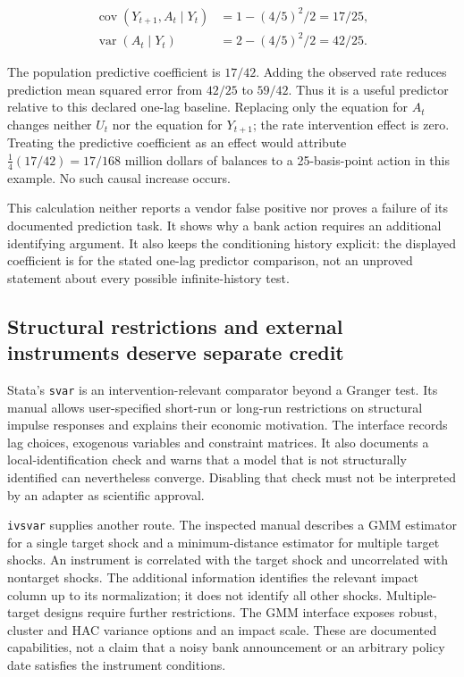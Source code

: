 \[
 \begin{aligned}
 \operatorname{cov}(Y_{t+1},A_t\mid Y_t)&=1-(4/5)^2/2=17/25,\\
 \operatorname{var}(A_t\mid Y_t)&=2-(4/5)^2/2=42/25.
 \end{aligned}
\]

The population predictive coefficient is \(17/42\). Adding the observed
rate reduces prediction mean squared error from \(42/25\) to \(59/42\).
Thus it is a useful predictor relative to this declared one-lag
baseline. Replacing only the equation for \(A_t\) changes neither
\(U_t\) nor the equation for \(Y_{t+1}\); the rate intervention effect
is zero. Treating the predictive coefficient as an effect would
attribute \(\tfrac14(17/42)=17/168\) million dollars of balances to a
25-basis-point action in this example. No such causal increase occurs.
\citep{exec13_ct_examples}

This calculation neither reports a vendor false positive nor proves a
failure of its documented prediction task. It shows why a bank action
requires an additional identifying argument. It also keeps the
conditioning history explicit: the displayed coefficient is for the
stated one-lag predictor comparison, not an unproved statement about
every possible infinite-history test.

\hypertarget{structural-restrictions-and-external-instruments-deserve-separate-credit}{%
\subsection{Structural restrictions and external instruments deserve
separate
credit}\label{structural-restrictions-and-external-instruments-deserve-separate-credit}}

Stata's \texttt{svar} is an intervention-relevant comparator beyond a
Granger test. Its manual allows user-specified short-run or long-run
restrictions on structural impulse responses and explains their economic
motivation. The interface records lag choices, exogenous variables and
constraint matrices. It also documents a local-identification check and
warns that a model that is not structurally identified can nevertheless
converge. Disabling that check must not be interpreted by an adapter as
scientific approval. \citep{exec13_ct_stata_svar}

\texttt{ivsvar} supplies another route. The inspected manual describes a
GMM estimator for a single target shock and a minimum-distance estimator
for multiple target shocks. An instrument is correlated with the target
shock and uncorrelated with nontarget shocks. The additional information
identifies the relevant impact column up to its normalization; it does
not identify all other shocks. Multiple-target designs require further
restrictions. The GMM interface exposes robust, cluster and HAC variance
options and an impact scale. These are documented capabilities, not a
claim that a noisy bank announcement or an arbitrary policy date
satisfies the instrument conditions.~\citep{exec13_ct_stata_ivsvar}

